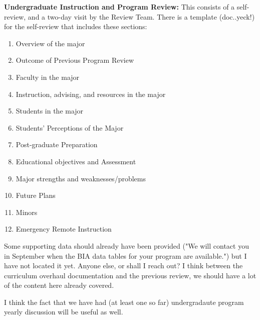 \documentclass[12pt]{article}
\begin{document}
{\bf Undergraduate Instruction and Program Review:}  This consists of a self-review, and a two-day visit by the Review Team.  There is a template (doc..yeck!) for the self-review that includes these sections:
\begin{enumerate} 
 \item Overview of the major
 \item Outcome of Previous Program Review
 \item Faculty in the major
 \item Instruction, advising, and resources in the major
 \item Students in the major
 \item Students’ Perceptions of the Major
 \item Post-graduate Preparation
 \item Educational objectives and Assessment
 \item Major strengths and weaknesses/problems
 \item Future Plans
 \item Minors
 \item Emergency Remote Instruction
\end{enumerate}
Some supporting data should already have been provided ("We will contact you in September when the BIA data tables for your program are available.") but I have not located it yet.  Anyone else, or shall I reach out?  I think between the curriculum overhaul documentation and the previous review, we should have a lot of the content here already covered.

I think the fact that we have had (at least one so far) undergradaute program yearly discussion will be useful as well.
\end{document}
